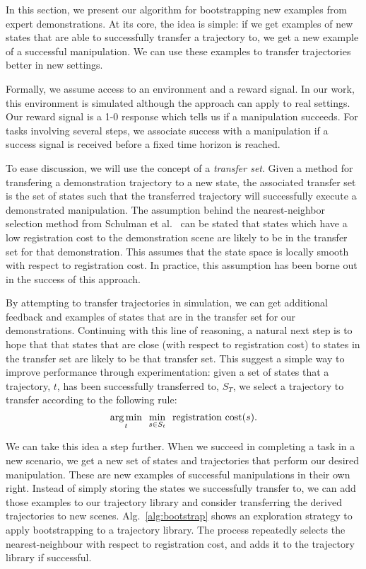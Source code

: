 In this section, we present our algorithm for bootstrapping new examples 
from expert demonstrations. At its core, the idea is simple: if we get
examples of new states that are able to successfully transfer a trajectory to,
we get a new example of a successful manipulation. We can use these examples
to transfer trajectories better in new settings.

Formally, we assume access to an environment and a reward signal. In our work, this
environment is simulated although the approach can apply to real settings. 
Our reward signal is a 1-0 response which tells us if a manipulation succeeds. For 
tasks involving several steps, we associate success with a manipulation if a success
signal is received before a fixed time horizon is reached.

To ease discussion, we will use the concept of a \emph{transfer set}. Given a method for
transfering a demonstration trajectory to a new state, the associated transfer set is
the set of states such that the transferred trajectory will successfully execute a
demonstrated manipulation. The assumption behind the nearest-neighbor selection
method from Schulman et al.~\cite{Schulmanetal_ISRR2013} can be stated that states
which have a low registration cost to the demonstration scene are likely to be in the
transfer set for that demonstration. This assumes that the state space is locally
smooth with respect to registration cost. In practice, this assumption has been
borne out in the success of this approach.


By attempting to transfer trajectories in simulation, we can get additional feedback
and examples of states that are in the transfer set for our demonstrations.
Continuing with this line of reasoning, a natural next step is to hope that that
states that are close (with respect to registration cost) to states in the transfer
set are likely to be that transfer set. This suggest a simple way to improve performance
through experimentation: given a set of
states that a trajectory, $t$,  has been successfully transferred to, $S_T$,
we select a trajectory to transfer according to the following rule:
\begin{equation}
\underset{t}{\operatorname*{arg\,min}} \ \ \underset{s\in S_t}{\min} \ \ {\text{registration cost}}(s).
\end{equation}

We can take this idea a step further. When we succeed in completing a task in a new scenario, we get a new set of states and trajectories that perform our desired manipulation.
These are new examples of successful manipulations in their own right. Instead of simply storing the states we successfully transfer to, we can add those examples to our trajectory 
library and consider transferring the derived trajectories to new scenes. Alg.~\ref{alg:bootstrap} shows an exploration strategy to apply bootstrapping to a trajectory library. The process
repeatedly selects the nearest-neighbour with respect to registration cost, and adds it to the trajectory library if successful.

